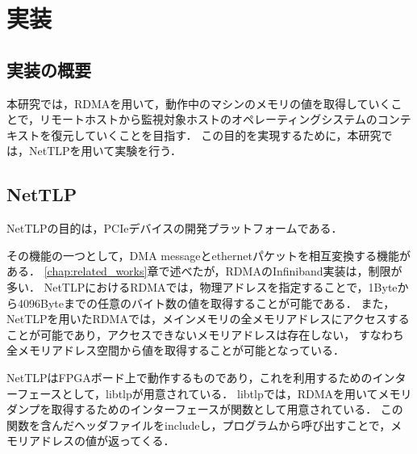 \chapter{実装}
\label{chap:implementation}




\section{実装の概要}

本研究では，RDMAを用いて，動作中のマシンのメモリの値を取得していくことで，リモートホストから監視対象ホストのオペレーティングシステムのコンテキストを復元していくことを目指す．
この目的を実現するために，本研究では，NetTLP\cite{246316}を用いて実験を行う．

\section{NetTLP}
\label{section:nettlp}

NetTLPの目的は，PCIeデバイスの開発プラットフォームである．

その機能の一つとして，DMA messageとethernetパケットを相互変換する機能がある．
\ref{chap:related_works}章で述べたが，RDMAのInfiniband実装は，制限が多い．
NetTLPにおけるRDMAでは，物理アドレスを指定することで，1Byteから4096Byteまでの任意のバイト数の値を取得することが可能である．
また，NetTLPを用いたRDMAでは，メインメモリの全メモリアドレスにアクセスすることが可能であり，アクセスできないメモリアドレスは存在しない，
すなわち全メモリアドレス空間から値を取得することが可能となっている．

NetTLPはFPGAボード上で動作するものであり，これを利用するためのインターフェースとして，libtlpが用意されている．
libtlpでは，RDMAを用いてメモリダンプを取得するためのインターフェースが関数として用意されている．
この関数を含んだヘッダファイルをincludeし，プログラムから呼び出すことで，メモリアドレスの値が返ってくる．

